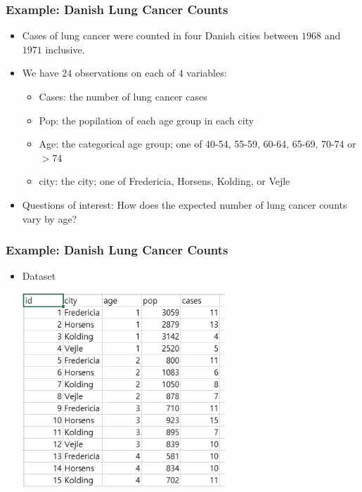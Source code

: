 \documentclass[10pt,xcolor={svgnames},t]{beamer}
\begin{document}
\begin{frame}
	\frametitle{Example: Danish Lung Cancer Counts}
	
	\begin{itemize}
		\item Cases of lung cancer were counted in four Danish cities between $1968$ and $1971$ inclusive.
		\bigskip
		\item We have $24$ observations on each of $4$ variables:
		\begin{itemize}
			\item Cases: the number of lung cancer cases
			\item Pop: the popilation of each age group in each city
			\item Age: the categorical age group; one of 40-54, 55-59, 60-64, 65-69, 70-74 or $>$74
			\item city: the city; one of Fredericia, Horsens, Kolding, or Vejle
		\end{itemize}
		\bigskip
		\item Questions of interest: How does the expected number of lung cancer counts vary by age?
	\end{itemize}
	
	
\end{frame}
%
%
\begin{frame}
	\frametitle{Example: Danish Lung Cancer Counts}
	
	\begin{itemize}
		\item Dataset
		\begin{center}
			\includegraphics[width=0.6\textwidth]{dataset.jpg}
		\end{center}
	\end{itemize}
	
	
\end{frame}
\end{document}
